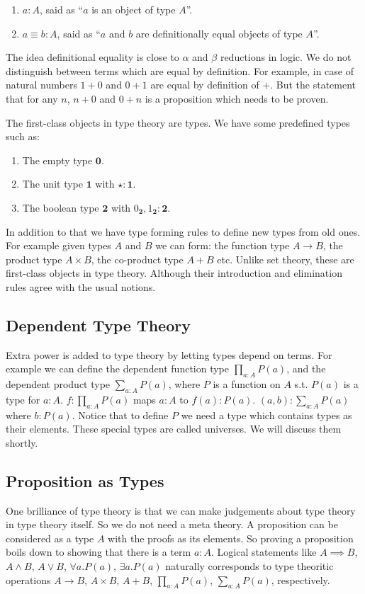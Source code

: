 \documentclass[10pt]{article}
\theoremstyle{definition}
\theoremstyle{plain}
\theoremstyle{remark}
\begin{document}
\begin{enumerate}
\item $a : A$, said as ``$a$ is an object of type $A$''.
\item $a \equiv b : A$, said as ``$a$ and $b$ are definitionally equal objects of type $A$''. 
\end{enumerate} 

The idea definitional equality is close to $\alpha$ and $\beta$ reductions in logic. We 
do not distinguish between terms which are equal by definition. For example, in case of 
natural numbers $1 + 0$ and $0 + 1$ are equal by definition of $+$. But the statement that 
for any $n$, $n + 0$ and $0 + n$ is a proposition which needs to be proven. \smallskip

The first-class objects in type theory are types. We have some predefined types such as:
\begin{enumerate}
\item The empty type $\mathbf{0}$.
\item The unit type $\mathbf{1}$ with $\star : \mathbf{1}$.
\item The boolean type $\mathbf{2}$ with $0_{\mathbf{2}}, 1_{\mathbf{2}} : \mathbf{2}$.  
\end{enumerate}
In addition to that we have type forming
rules to define new types from old ones. For example given types $A$ and $B$ we can form: 
the function type $A \to B$, the product type $A \times B$, the co-product type $A + B$ etc.
Unlike set theory, these are first-class objects in type theory. Although their introduction
and elimination rules agree with the usual notions.

\subsection{Dependent Type Theory}
Extra power is added to type theory by letting types depend on terms. For example we can 
define the dependent function type $\prod_{a : A} P(a)$, and the dependent product type
$\sum_{a : A} P(a)$, where $P$ is a function on $A$ s.t. $P(a)$ is a type for $a : A$. 
$f : \prod_{a : A} P(a)$ maps $a : A$ to $f(a) : P(a)$. $(a,b) : \sum_{a : A} P(a)$ where
$b : P(a)$. Notice that to define $P$ we need a type which contains types as their elements.
These special types are called universes. We will discuss them shortly. 
 
\subsection{Proposition as Types}
One brilliance of type theory is that we can make judgements about type theory in type theory
itself. So we do not need a meta theory. A proposition can be considered as a type $A$ with 
the proofs as its elements. So proving a proposition boils down to showing that there is a
term $a : A$. Logical statements like $A \implies B$, $A \wedge B$, $A \vee B$, 
$\forall a. P(a)$, $\exists a. P(a)$ naturally corresponds to type theoritic operations 
$A \to B$, $A \times B$, $A + B$, $\prod_{a : A} P(a)$, $\sum_{a : A} P(a)$, 
respectively.\smallskip
\end{document}
